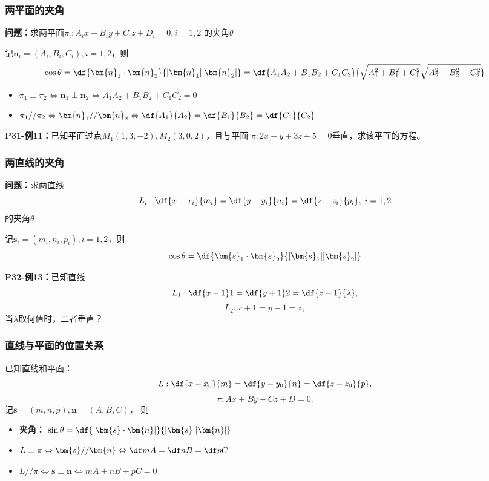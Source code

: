 \subsubsection{两平面的夹角}

{\bf 问题：}求两平面$\pi_i:A_ix+B_iy+C_iz+D_i=0,i=1,2$
的夹角$\theta$

记$\bm{n}_i=(A_i,B_i,C_i),i=1,2$，则
$$\cos\theta=\df{\bm{n}_1\cdot\bm{n}_2}{|\bm{n}_1||\bm{n}_2|}
=\df{A_1A_2+B_1B_2+C_1C_2}{\sqrt{A_1^2+B_1^2+C_1^2}
\sqrt{A_2^2+B_2^2+C_2^2}}$$

\begin{itemize}
  \item $\pi_1\perp\pi_2 \Leftrightarrow\bm{n}_1\perp\bm{n}_2 
	  \Leftrightarrow A_1A_2+B_1B_2+C_1C_2=0$
  \item $\pi_1//\pi_2 \Leftrightarrow\bm{n}_1//\bm{n}_2 
	  \Leftrightarrow\df{A_1}{A_2}=\df{B_1}{B_2}=\df{C_1}{C_2}$
\end{itemize}

{\bf P31-例11：}已知平面过点$M_1(1,3,-2),M_2(3,0,2)$，且与平面
$\pi:2x+y+3z+5=0$垂直，求该平面的方程。

\subsubsection{两直线的夹角}

{\bf 问题：}求两直线
$$L_i:\df{x-x_i}{m_i}=\df{y-y_i}{n_i}=\df{z-z_i}{p_i},\;i=1,2$$
的夹角$\theta$ 

记$\bm{s}_i=(m_i,n_i,p_i),i=1,2$，则
$${\cos\theta=\df{\bm{s}_1\cdot\bm{s}_2}{|\bm{s}_1||\bm{s}_2|}}$$

{\bf P32-例13：}已知直线
$$L_1:\df{x-1}1=\df{y+1}2=\df{z-1}{\lambda},$$
$$L_2:x+1=y-1=z,$$
当$\lambda$取何值时，二者垂直？

\subsubsection{直线与平面的位置关系}

已知直线和平面：
$$L:\df{x-x_0}{m}=\df{y-y_0}{n}=\df{z-z_0}{p},$$
$$\pi:Ax+By+Cz+D=0.$$ 
记$\bm{s}=(m,n,p),\bm{n}=(A,B,C)$， 则
\begin{itemize}
  \item {\bf 夹角：}
  $\sin\theta=\df{|\bm{s}\cdot\bm{n}|}{|\bm{s}||\bm{n}|}$ 
  \item $L\perp\pi \Leftrightarrow\bm{s}//\bm{n} 
  \Leftrightarrow \df mA=\df nB=\df pC$ 
  \item $L//\pi \Leftrightarrow\bm{s}\perp\bm{n} 
  \Leftrightarrow mA+nB+pC=0$
\end{itemize}

